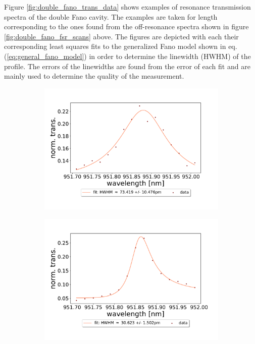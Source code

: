 Figure \ref{fig:double_fano_trans_data} shows examples of resonance transmission spectra of the double Fano cavity. The examples are taken for length corresponding to the ones found from the off-resonance spectra shown in figure \ref{fig:double_fano_fsr_scans} above. The figures are depicted with each their corresponding least squares fits to the generalized Fano model shown in eq. (\ref{eq:general_fano_model}) in order to determine the linewidth (HWHM) of the profile. The errors of the linewidths are found from the error of each fit and are mainly used to determine the quality of the measurement. 

\begin{figure}[h!]
    \centering
    \begin{subfigure}[b]{0.49\textwidth}
        \centering
        \includegraphics[width=\textwidth]{figures/results/double fano fits/30um_M3:M5_fit_4.pdf}
        \caption{}
        \label{fig:short_double_fano_trans}
    \end{subfigure}
    \begin{subfigure}[b]{0.49\textwidth}
        \centering
        \includegraphics[width=\textwidth]{figures/results/double fano fits/550um_M3:M5_fit_1.pdf}

\end{subfigure}
\end{figure}
